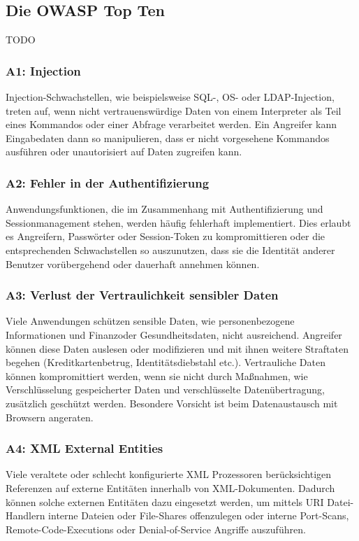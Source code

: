\documentclass[12pt,oneside,a4paper,parskip]{scrbook}
\begin{document}
    \subsection{Die OWASP Top Ten}
    TODO
\cite{OWASPtop10}

    \subsubsection{A1: Injection}
    Injection-Schwachstellen, wie beispielsweise SQL-, OS- oder LDAP-Injection, treten auf, wenn
    nicht vertrauenswürdige Daten von einem Interpreter als Teil eines Kommandos oder einer
    Abfrage verarbeitet werden. Ein Angreifer kann Eingabedaten dann so manipulieren, dass er nicht
    vorgesehene Kommandos ausführen oder unautorisiert auf Daten zugreifen kann.

    \subsubsection{A2: Fehler in der Authentifizierung}
    Anwendungsfunktionen, die im Zusammenhang mit Authentifizierung und Sessionmanagement
    stehen, werden häufig fehlerhaft implementiert. Dies erlaubt es Angreifern, Passwörter oder
    Session-Token zu kompromittieren oder die entsprechenden Schwachstellen so auszunutzen,
    dass sie die Identität anderer Benutzer vorübergehend oder dauerhaft annehmen können.

    \subsubsection{A3: Verlust der Vertraulichkeit sensibler Daten}
    Viele Anwendungen schützen sensible Daten, wie personenbezogene Informationen und Finanzoder
    Gesundheitsdaten, nicht ausreichend. Angreifer können diese Daten auslesen oder
    modifizieren und mit ihnen weitere Straftaten begehen (Kreditkartenbetrug, Identitätsdiebstahl
    etc.). Vertrauliche Daten können kompromittiert werden, wenn sie nicht durch Maßnahmen, wie
    Verschlüsselung gespeicherter Daten und verschlüsselte Datenübertragung, zusätzlich geschützt
    werden. Besondere Vorsicht ist beim Datenaustausch mit Browsern angeraten.

    \subsubsection{A4: XML External Entities}
    Viele veraltete oder schlecht konfigurierte XML Prozessoren berücksichtigen Referenzen auf
    externe Entitäten innerhalb von XML-Dokumenten. Dadurch können solche externen Entitäten
    dazu eingesetzt werden, um mittels URI Datei-Handlern interne Dateien oder File-Shares offenzulegen
    oder interne Port-Scans, Remote-Code-Executions oder Denial-of-Service Angriffe
    auszuführen.
\end{document}
